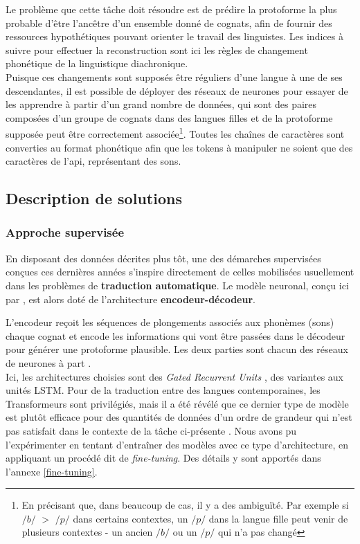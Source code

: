 \documentclass[12pt, twoside]{report}
\begin{document}
Le problème que cette tâche doit résoudre est de prédire la \gls{protoforme} la plus probable d'être l'ancêtre d'un ensemble donné de \glspl{cognat}, afin de fournir des ressources hypothétiques pouvant orienter le travail des linguistes. Les indices à suivre pour effectuer la reconstruction sont ici les règles de changement phonétique de la linguistique diachronique.\\
\indent Puisque ces changements sont supposés être réguliers d'une langue à une de ses descendantes, il est possible de déployer des réseaux de neurones pour essayer de les apprendre à partir d'un grand nombre de données, qui sont des paires composées d'un groupe de \glspl{cognat} dans des langues filles et de la \gls{protoforme} supposée peut être correctement associée\footnote{En précisant que, dans beaucoup de cas, il y a des ambiguïté. Par exemple si $/b/$ $>$ $/p/$ dans certains contextes, un $/p/$ dans la langue fille peut venir de plusieurs contextes - un ancien $/b/$ ou un $/p/$ qui n'a pas changé}. Toutes les chaînes de caractères sont converties au format phonétique afin que les tokens à manipuler ne soient que des caractères de l'\Gls{api}, représentant des sons.


\subsection{Description de solutions}
\subsubsection{Approche supervisée} \label{descr_meloni}
En disposant des données décrites plus tôt, une des démarches supervisées conçues ces dernières années s'inspire directement de celles mobilisées usuellement dans les problèmes de \textbf{traduction automatique}. Le modèle neuronal, conçu ici par \cite{meloni-etal-2021-ab}, est alors doté de l'architecture \textbf{encodeur-décodeur}.

L'encodeur reçoit les séquences de plongements associés aux phonèmes (sons) chaque \gls{cognat} et encode les informations qui vont être passées dans le décodeur pour générer une \gls{protoforme} plausible. Les deux parties sont chacun des réseaux de neurones à part \autocite[pour avoir un parallèle avec la traduction automatique plus généralement, voir][chap.9, p.17-21]{jurafsky}.\\
Ici, les architectures choisies sont des \textit{Gated Recurrent Units} \autocite{gru}, des variantes aux unités LSTM. Pour de la traduction entre des langues contemporaines, les Transformeurs sont privilégiés, mais il a été révélé que ce dernier type de modèle est plutôt efficace pour des quantités de données d'un ordre de grandeur qui n'est pas satisfait dans le contexte de la tâche ci-présente \autocite{fourrier, araabi-monz-2020-optimizing, bawden-etal-2022-automatic}. Nous avons pu l'expérimenter en tentant d'entraîner des modèles avec ce type d'architecture, en appliquant un procédé dit de \textit{fine-tuning}. Des détails y sont apportés dans l'annexe \ref{fine-tuning}.\\
\end{document}
